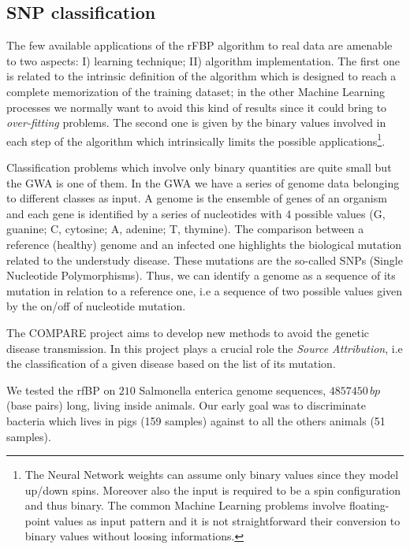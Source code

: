 \documentclass{standalone}
\begin{document}
\subsection[Compare dataset]{SNP classification}\label{rfbp:snp}

The few available applications of the rFBP algorithm to real data are amenable to two aspects: I) learning technique; II) algorithm implementation.
The first one is related to the intrinsic definition of the algorithm which is designed to reach a complete memorization of the training dataset; in the other Machine Learning processes we normally want to avoid this kind of results since it could bring to \emph{over-fitting} problems.
The second one is given by the binary values involved in each step of the algorithm which intrinsically limits the possible applications\footnote{
  The Neural Network weights can assume only binary values since they model up/down spins.
  Moreover also the input is required to be a spin configuration and thus binary.
  The common Machine Learning problems involve floating-point values as input pattern and it is not straightforward their conversion to binary values without loosing informations.
}.

Classification problems which involve only binary quantities are quite small but the GWA is one of them.
In the GWA we have a series of genome data belonging to different classes as input.
A genome is the ensemble of genes of an organism and each gene is identified by a series of nucleotides with 4 possible values (G, guanine; C, cytosine; A, adenine; T, thymine).
The comparison between a reference (healthy) genome and an infected one highlights the biological mutation related to the understudy disease.
These mutations are the so-called SNPs (Single Nucleotide Polymorphisms).
Thus, we can identify a genome as a sequence of its mutation in relation to a reference one, i.e a sequence of two possible values given by the on/off of nucleotide mutation.

The COMPARE project aims to develop new methods to avoid the genetic disease transmission.
In this project plays a crucial role the \emph{Source Attribution}, i.e the classification of a given disease based on the list of its mutation.

We tested the rfBP on $210$ Salmonella enterica genome sequences, $4857450\,bp$ (base pairs) long, living inside animals.
Our early goal was to discriminate bacteria which lives in pigs (159 samples) against to all the others animals (51 samples).
\end{document}
